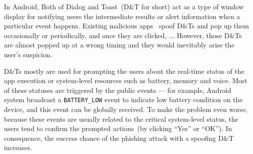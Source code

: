 In Android, Both of Dialog and Toast~(D\&T for short) 
act as a type of window display for notifying users the intermediate results or alert information when a particular event happens. 
Existing malicious apps~\cite{@chenkai: need citation here} spoof D\&Ts and pop up them occasionally or periodically, 
and once they are clicked, ... 
However, those D\&Ts are almost popped up at a wrong timing and they would inevitably arise the user's suspicion. 






D\&Ts mostly are used for prompting the users about the real-time status of the app execution or system-level resources such as battery, memory and voice. 
Most of these statuses are triggered by the public events --- for example, Android system broadcast a \texttt{BATTERY\_LOW} event to 
indicate low battery condition on the device, and this event can be globally received. 
To make the problem even worse, 
because these events are usually related to the critical system-level status, 
the users tend to confirm the prompted actions~(by clicking ``Yes'' or ``OK''). 
In consequence, the success chance of the phishing attack with a spoofing D\&T increases. 


